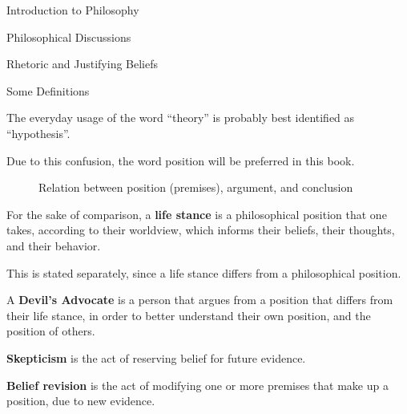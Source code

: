 \begin{chapter}{Introduction to Philosophy}
\begin{section}{Philosophical Discussions}
\begin{subsection}{Rhetoric and Justifying Beliefs}
\begin{subsubsection}{Some Definitions}
\begin{definition}
                    The everyday usage of the word ``theory'' is probably best identified as ``hypothesis''.
                        
                    Due to this confusion, the word position will be preferred in this book.
                \end{definition}
                    
                \begin{figure}[ht]
                    \centering
                    \caption{Relation between position (premises), argument, and conclusion}
                \end{figure}
                    
                \begin{definition}
                    For the sake of comparison, a \textbf{life stance} is a philosophical position that one takes, according to their worldview, which informs their beliefs, their thoughts, and their behavior.
                        
                    This is stated separately, since a life stance differs from a philosophical position.
                \end{definition}
                    
                \begin{definition}
                    A \textbf{Devil's Advocate} is a person that argues from a position that differs from their life stance, in order to better understand their own position, and the position of others.
                \end{definition}
                    
                \begin{definition}
                    \textbf{Skepticism} is the act of reserving belief for future evidence.
                \end{definition}
                
                \begin{definition}
                    \textbf{Belief revision} is the act of modifying one or more premises that make up a position, due to new evidence.
                \end{definition}
            \end{subsubsection}
            

\end{subsection}
\end{section}
\end{chapter}

